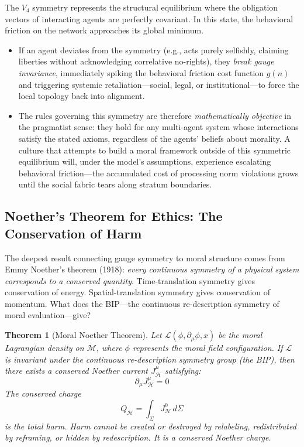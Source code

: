 \documentclass[12pt,letterpaper]{article}
\newtheorem{theorem}{Theorem}[section]
\theoremstyle{definition}
\theoremstyle{remark}
\newcommand{\M}{\mathcal{M}}
\newcommand{\harm}{\mathcal{H}}
\newcommand{\Lag}{\mathcal{L}}
\begin{document}
The $V_4$ symmetry represents the structural equilibrium where the obligation vectors of interacting agents are perfectly covariant. In this state, the behavioral friction on the network approaches its global minimum.

\begin{itemize}
    \item If an agent deviates from the symmetry (e.g., acts purely selfishly, claiming liberties without acknowledging correlative no-rights), they \emph{break gauge invariance}, immediately spiking the behavioral friction cost function $g(n)$ and triggering systemic retaliation---social, legal, or institutional---to force the local topology back into alignment.
    \item The rules governing this symmetry are therefore \emph{mathematically objective} in the pragmatist sense: they hold for any multi-agent system whose interactions satisfy the stated axioms, regardless of the agents' beliefs about morality. A culture that attempts to build a moral framework outside of this symmetric equilibrium will, under the model's assumptions, experience escalating behavioral friction---the accumulated cost of processing norm violations grows until the social fabric tears along stratum boundaries.
\end{itemize}

\subsection{Noether's Theorem for Ethics: The Conservation of Harm}

The deepest result connecting gauge symmetry to moral structure comes from Emmy Noether's theorem (1918): \emph{every continuous symmetry of a physical system corresponds to a conserved quantity}. Time-translation symmetry gives conservation of energy. Spatial-translation symmetry gives conservation of momentum. What does the BIP---the continuous re-description symmetry of moral evaluation---give?

\begin{theorem}[Moral Noether Theorem]
\label{thm:noether}
Let $\Lag(\phi, \partial_\mu \phi, x)$ be the moral Lagrangian density on $\M$, where $\phi$ represents the moral field configuration. If $\Lag$ is invariant under the continuous re-description symmetry group (the BIP), then there exists a conserved Noether current $J^\mu_\harm$ satisfying:
\begin{equation}
\partial_\mu J^\mu_\harm = 0
\label{eq:conservation}
\end{equation}
The conserved charge
\begin{equation}
Q_\harm = \int_\Sigma J^0_\harm \, d\Sigma
\label{eq:charge}
\end{equation}
is the \emph{total harm}. Harm cannot be created or destroyed by relabeling, redistributed by reframing, or hidden by redescription. It is a conserved Noether charge.
\end{theorem}
\end{document}

